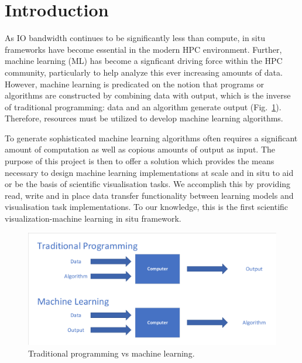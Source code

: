 \section{Introduction}
As IO bandwidth continues to be significantly less than compute, in situ frameworks have become essential in the modern HPC environment. Further, machine learning (ML) has become a signficant driving force within the HPC community, particularly to help analyze this ever increasing amounts of data. However, machine learning is predicated on the notion that programs or algorithms are constructed by combining data with output, which is the inverse of traditional programming: data and an algorithm generate output (Fig.~\ref{fig:ml-vs-trad}). Therefore, resources must be utilized to develop machine learning algorithms. 

To generate sophisticated machine learning algorithms often requires a significant amount of computation as well as copious amounts of output as input. The purpose of this project is then to offer a solution which provides the means necessary to design machine learning implementations at scale and in situ to aid or be the basis of scientific visualisation tasks. We accomplish this by providing read, write and in place data transfer functionality between learning models and visualisation task implementations. To our knowledge, this is the first scientific visualization-machine learning in situ framework.

\begin{figure}
    \includegraphics[width=\linewidth]{ML-data-output-program}
    \caption{Traditional programming vs machine learning.}
    \label{fig:ml-vs-trad}
  \end{figure}

